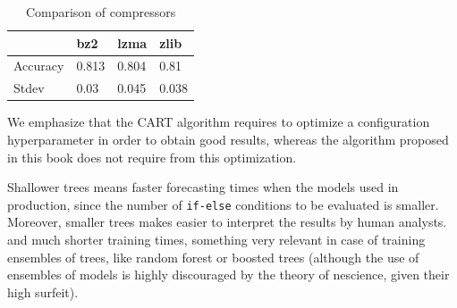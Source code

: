 \begin{table}[h]
\label{table:compressor}
\centering
\begin{tabular}{l l l l}
\toprule
 & \textbf{bz2} & \textbf{lzma} & \textbf{zlib} \\
\midrule
Accuracy & 0.813 & 0.804 & 0.81 \\
Stdev & 0.03 & 0.045 & 0.038 \\
\bottomrule
\end{tabular}
\caption{Comparison of compressors}
\end{table}

We emphasize that the CART algorithm requires to optimize a configuration hyperparameter in order to obtain good results, whereas the algorithm proposed in this book does not require from this optimization.

Shallower trees means faster forecasting times when the models used in production, since the number of \texttt{if-else} conditions to be evaluated is smaller. Moreover, smaller trees makes easier to interpret the results by human analysts. and much shorter training times, something very relevant in case of training ensembles of trees, like random forest or boosted trees (although the use of ensembles of models is highly discouraged by the theory of nescience, given their high surfeit).

%
%




